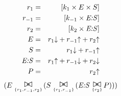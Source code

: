 


\begin{eqnarray*}
r_1 & = & [k_1 \times  E \times  S]\\%
r_{-1} & = & [k_{-1} \times  \hbox{\textit{E:S}}]\\%
r_2 & = & [k_2 \times  \hbox{\textit{E:S}}]\\%
%
E & = & r_1{\downarrow} +  r_{-1}{\uparrow}  +  r_2{\uparrow} \\%
S & = & r_1{\downarrow}  +  r_{-1}{\uparrow} \\%
\hbox{\textit{E:S}} & = & r_1{\uparrow}  +  r_{-1}{\downarrow}  +  r_2{\downarrow} \\%
P & = & r_2{\uparrow} \\%
\end{eqnarray*}
%
\begin{displaymath}
(E \sync{\{r_1, r_{-1}, r_2\}} (S \sync{\{r_1, r_{-1}\}} (\hbox{\textit{E:S}} \sync{\{r_2\}} P)))%
\end{displaymath}
